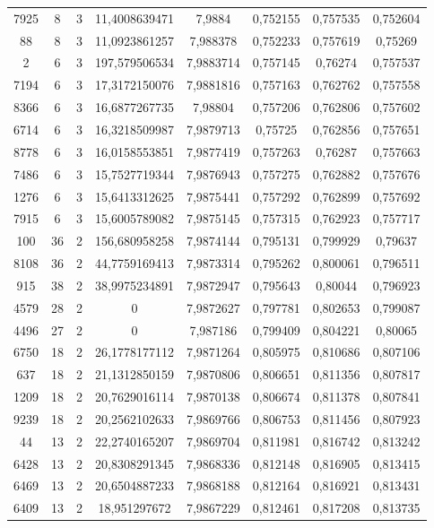 \begin{longtable}{|c|c|c|c|c|c|c|c|}
7925 & 8 & 3 & 11,4008639471 & 7,9884 & 0,752155 & 0,757535 & 0,752604 \\
88 & 8 & 3 & 11,0923861257 & 7,988378 & 0,752233 & 0,757619 & 0,75269 \\
2 & 6 & 3 & 197,579506534 & 7,9883714 & 0,757145 & 0,76274 & 0,757537 \\
7194 & 6 & 3 & 17,3172150076 & 7,9881816 & 0,757163 & 0,762762 & 0,757558 \\
8366 & 6 & 3 & 16,6877267735 & 7,98804 & 0,757206 & 0,762806 & 0,757602 \\
6714 & 6 & 3 & 16,3218509987 & 7,9879713 & 0,75725 & 0,762856 & 0,757651 \\
8778 & 6 & 3 & 16,0158553851 & 7,9877419 & 0,757263 & 0,76287 & 0,757663 \\
7486 & 6 & 3 & 15,7527719344 & 7,9876943 & 0,757275 & 0,762882 & 0,757676 \\
1276 & 6 & 3 & 15,6413312625 & 7,9875441 & 0,757292 & 0,762899 & 0,757692 \\
7915 & 6 & 3 & 15,6005789082 & 7,9875145 & 0,757315 & 0,762923 & 0,757717 \\
100 & 36 & 2 & 156,680958258 & 7,9874144 & 0,795131 & 0,799929 & 0,79637 \\
8108 & 36 & 2 & 44,7759169413 & 7,9873314 & 0,795262 & 0,800061 & 0,796511 \\
915 & 38 & 2 & 38,9975234891 & 7,9872947 & 0,795643 & 0,80044 & 0,796923 \\
4579 & 28 & 2 & 0 & 7,9872627 & 0,797781 & 0,802653 & 0,799087 \\
4496 & 27 & 2 & 0 & 7,987186 & 0,799409 & 0,804221 & 0,80065 \\
6750 & 18 & 2 & 26,1778177112 & 7,9871264 & 0,805975 & 0,810686 & 0,807106 \\
637 & 18 & 2 & 21,1312850159 & 7,9870806 & 0,806651 & 0,811356 & 0,807817 \\
1209 & 18 & 2 & 20,7629016114 & 7,9870138 & 0,806674 & 0,811378 & 0,807841 \\
9239 & 18 & 2 & 20,2562102633 & 7,9869766 & 0,806753 & 0,811456 & 0,807923 \\
44 & 13 & 2 & 22,2740165207 & 7,9869704 & 0,811981 & 0,816742 & 0,813242 \\
6428 & 13 & 2 & 20,8308291345 & 7,9868336 & 0,812148 & 0,816905 & 0,813415 \\
6469 & 13 & 2 & 20,6504887233 & 7,9868188 & 0,812164 & 0,816921 & 0,813431 \\
6409 & 13 & 2 & 18,951297672 & 7,9867229 & 0,812461 & 0,817208 & 0,813735 \\

\end{longtable}
